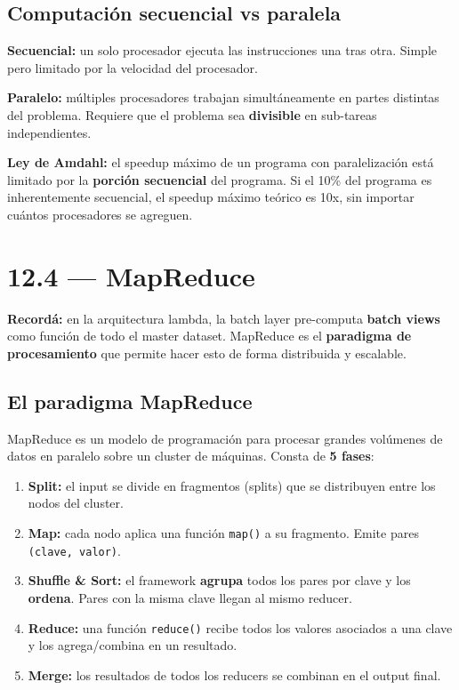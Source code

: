 \documentclass[11pt, a4paper]{article}
\begin{document}
\subsection{Computación secuencial vs paralela}

\textbf{Secuencial:} un solo procesador ejecuta las instrucciones una tras otra. Simple pero limitado por la velocidad del procesador.

\textbf{Paralelo:} múltiples procesadores trabajan simultáneamente en partes distintas del problema. Requiere que el problema sea \textbf{divisible} en sub-tareas independientes.

\textbf{Ley de Amdahl:} el speedup máximo de un programa con paralelización está limitado por la \textbf{porción secuencial} del programa. Si el 10\% del programa es inherentemente secuencial, el speedup máximo teórico es 10x, sin importar cuántos procesadores se agreguen.

\section{12.4 — MapReduce}

\begin{recallbox}
	\textbf{Recordá:} en la arquitectura lambda, la batch layer pre-computa \textbf{batch views} como función de todo el master dataset. MapReduce es el \textbf{paradigma de procesamiento} que permite hacer esto de forma distribuida y escalable.
\end{recallbox}

\subsection{El paradigma MapReduce}

MapReduce es un modelo de programación para procesar grandes volúmenes de datos en paralelo sobre un cluster de máquinas. Consta de \textbf{5 fases}:

\begin{enumerate}
	\item \textbf{Split:} el input se divide en fragmentos (splits) que se distribuyen entre los nodos del cluster.
	\item \textbf{Map:} cada nodo aplica una función \texttt{map()} a su fragmento. Emite pares \texttt{(clave, valor)}.
	\item \textbf{Shuffle \& Sort:} el framework \textbf{agrupa} todos los pares por clave y los \textbf{ordena}. Pares con la misma clave llegan al mismo reducer.
	\item \textbf{Reduce:} una función \texttt{reduce()} recibe todos los valores asociados a una clave y los agrega/combina en un resultado.
	\item \textbf{Merge:} los resultados de todos los reducers se combinan en el output final.
\end{enumerate}
\end{document}
